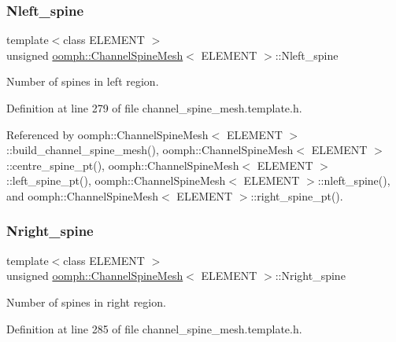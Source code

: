 \subsubsection{\texorpdfstring{Nleft\+\_\+spine}{Nleft\_spine}}
{\footnotesize\ttfamily template$<$class E\+L\+E\+M\+E\+NT $>$ \\
unsigned \hyperlink{classoomph_1_1ChannelSpineMesh}{oomph\+::\+Channel\+Spine\+Mesh}$<$ E\+L\+E\+M\+E\+NT $>$\+::Nleft\+\_\+spine\hspace{0.3cm}{\ttfamily [protected]}}



Number of spines in left region. 



Definition at line 279 of file channel\+\_\+spine\+\_\+mesh.\+template.\+h.



Referenced by oomph\+::\+Channel\+Spine\+Mesh$<$ E\+L\+E\+M\+E\+N\+T $>$\+::build\+\_\+channel\+\_\+spine\+\_\+mesh(), oomph\+::\+Channel\+Spine\+Mesh$<$ E\+L\+E\+M\+E\+N\+T $>$\+::centre\+\_\+spine\+\_\+pt(), oomph\+::\+Channel\+Spine\+Mesh$<$ E\+L\+E\+M\+E\+N\+T $>$\+::left\+\_\+spine\+\_\+pt(), oomph\+::\+Channel\+Spine\+Mesh$<$ E\+L\+E\+M\+E\+N\+T $>$\+::nleft\+\_\+spine(), and oomph\+::\+Channel\+Spine\+Mesh$<$ E\+L\+E\+M\+E\+N\+T $>$\+::right\+\_\+spine\+\_\+pt().

\mbox{\label{classoomph_1_1ChannelSpineMesh_a56f7259d8e5dee66a8c83ffe99526c62}} 
\subsubsection{\texorpdfstring{Nright\+\_\+spine}{Nright\_spine}}
{\footnotesize\ttfamily template$<$class E\+L\+E\+M\+E\+NT $>$ \\
unsigned \hyperlink{classoomph_1_1ChannelSpineMesh}{oomph\+::\+Channel\+Spine\+Mesh}$<$ E\+L\+E\+M\+E\+NT $>$\+::Nright\+\_\+spine\hspace{0.3cm}{\ttfamily [protected]}}



Number of spines in right region. 



Definition at line 285 of file channel\+\_\+spine\+\_\+mesh.\+template.\+h.



